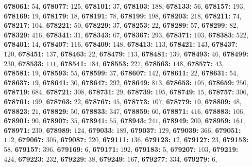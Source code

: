 \textsf{\bfseries 678061:} $54$, \textsf{\bfseries 678077:} $125$, \textsf{\bfseries 678101:} $37$, \textsf{\bfseries 678103:} $188$, \textsf{\bfseries 678133:} $56$, \textsf{\bfseries 678157:} $193$, \textsf{\bfseries 678169:} $19$, \textsf{\bfseries 678179:} $18$, \textsf{\bfseries 678191:} $78$, \textsf{\bfseries 678199:} $198$, \textsf{\bfseries 678203:} $218$, \textsf{\bfseries 678211:} $74$, \textsf{\bfseries 678217:} $104$, \textsf{\bfseries 678221:} $50$, \textsf{\bfseries 678229:} $37$, \textsf{\bfseries 678253:} $22$, \textsf{\bfseries 678289:} $57$, \textsf{\bfseries 678299:} $82$, \textsf{\bfseries 678329:} $416$, \textsf{\bfseries 678341:} $31$, \textsf{\bfseries 678343:} $67$, \textsf{\bfseries 678367:} $293$, \textsf{\bfseries 678371:} $103$, \textsf{\bfseries 678383:} $522$, \textsf{\bfseries 678401:} $14$, \textsf{\bfseries 678407:} $116$, \textsf{\bfseries 678409:} $148$, \textsf{\bfseries 678413:} $113$, \textsf{\bfseries 678421:} $143$, \textsf{\bfseries 678437:} $120$, \textsf{\bfseries 678451:} $137$, \textsf{\bfseries 678463:} $22$, \textsf{\bfseries 678479:} $113$, \textsf{\bfseries 678481:} $139$, \textsf{\bfseries 678493:} $46$, \textsf{\bfseries 678499:} $230$, \textsf{\bfseries 678533:} $111$, \textsf{\bfseries 678541:} $184$, \textsf{\bfseries 678553:} $227$, \textsf{\bfseries 678563:} $148$, \textsf{\bfseries 678577:} $43$, \textsf{\bfseries 678581:} $19$, \textsf{\bfseries 678593:} $55$, \textsf{\bfseries 678599:} $37$, \textsf{\bfseries 678607:} $142$, \textsf{\bfseries 678611:} $22$, \textsf{\bfseries 678631:} $54$, \textsf{\bfseries 678637:} $19$, \textsf{\bfseries 678641:} $30$, \textsf{\bfseries 678647:} $292$, \textsf{\bfseries 678649:} $813$, \textsf{\bfseries 678653:} $105$, \textsf{\bfseries 678659:} $250$, \textsf{\bfseries 678719:} $684$, \textsf{\bfseries 678721:} $308$, \textsf{\bfseries 678731:} $29$, \textsf{\bfseries 678739:} $195$, \textsf{\bfseries 678749:} $15$, \textsf{\bfseries 678757:} $306$, \textsf{\bfseries 678761:} $199$, \textsf{\bfseries 678763:} $22$, \textsf{\bfseries 678767:} $45$, \textsf{\bfseries 678773:} $107$, \textsf{\bfseries 678779:} $10$, \textsf{\bfseries 678809:} $48$, \textsf{\bfseries 678823:} $21$, \textsf{\bfseries 678829:} $50$, \textsf{\bfseries 678833:} $347$, \textsf{\bfseries 678859:} $60$, \textsf{\bfseries 678871:} $416$, \textsf{\bfseries 678883:} $106$, \textsf{\bfseries 678901:} $90$, \textsf{\bfseries 678907:} $35$, \textsf{\bfseries 678941:} $55$, \textsf{\bfseries 678943:} $241$, \textsf{\bfseries 678949:} $200$, \textsf{\bfseries 678959:} $161$, \textsf{\bfseries 678971:} $230$, \textsf{\bfseries 678989:} $124$, \textsf{\bfseries 679033:} $189$, \textsf{\bfseries 679037:} $129$, \textsf{\bfseries 679039:} $366$, \textsf{\bfseries 679051:} $112$, \textsf{\bfseries 679067:} $305$, \textsf{\bfseries 679087:} $220$, \textsf{\bfseries 679111:} $136$, \textsf{\bfseries 679123:} $12$, \textsf{\bfseries 679127:} $23$, \textsf{\bfseries 679153:} $58$, \textsf{\bfseries 679157:} $396$, \textsf{\bfseries 679169:} $6$, \textsf{\bfseries 679171:} $192$, \textsf{\bfseries 679183:} $5$, \textsf{\bfseries 679207:} $103$, \textsf{\bfseries 679219:} $424$, \textsf{\bfseries 679223:} $232$, \textsf{\bfseries 679229:} $38$, \textsf{\bfseries 679249:} $167$, \textsf{\bfseries 679277:} $334$, \textsf{\bfseries 679279:} $6$, 
